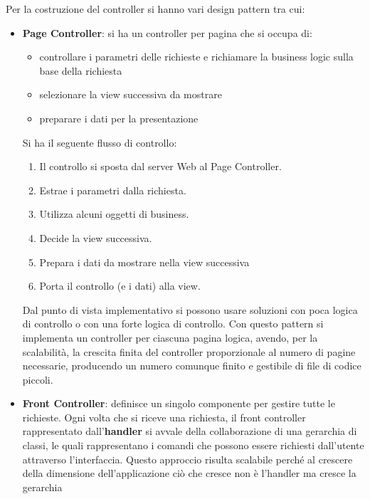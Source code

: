 Per la costruzione del controller si hanno vari design pattern tra cui:
\begin{itemize}
      \item \textbf{Page Controller}: si ha un controller per pagina che si occupa di:
            \begin{itemize}
                  \item controllare i parametri
                  delle richieste e richiamare la business logic sulla base della richiesta
                  \item selezionare la view successiva da mostrare
                  \item preparare i dati per la presentazione
            \end{itemize}
            Si ha il seguente flusso di controllo:
            \begin{enumerate}
                  \item Il controllo si sposta dal server Web al Page Controller.
                  \item Estrae i parametri dalla richiesta.
                  \item Utilizza alcuni oggetti di business.
                  \item Decide la view successiva.
                  \item Prepara i dati da mostrare nella view successiva
                  \item Porta il controllo (e i dati) alla view.
            \end{enumerate}
            Dal punto di vista implementativo si possono usare soluzioni con poca
            logica di controllo o con una forte logica di controllo. Con questo pattern
            si implementa un controller per ciascuna pagina logica, avendo, per la
            scalabilità, la crescita finita del controller proporzionale al numero
            di pagine necessarie, producendo un numero comunque finito e gestibile
            di file di codice piccoli.
      \item \textbf{Front Controller}: definisce un singolo componente per gestire
            tutte le richieste. Ogni volta che si riceve una richiesta, il front controller
            rappresentato dall'\textbf{handler} si avvale della collaborazione di una gerarchia
            di classi, le quali rappresentano i comandi che possono essere richiesti dall'utente
            attraverso l'interfaccia. Questo approccio risulta scalabile perché al crescere della
            dimensione dell'applicazione ciò che cresce non è l'handler ma cresce la gerarchia

\end{itemize}
